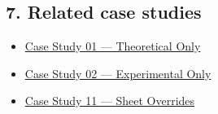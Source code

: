 \documentclass[
  11pt,
]{article}
\providecommand{\tightlist}{
  \setlength{\itemsep}{0pt}\setlength{\parskip}{0pt}}
\begin{document}
\hypertarget{7-related-case-studies}{
\subsection{7. Related case studies}\label{7-related-case-studies}}

\begin{itemize}
\tightlist
\item
  \href{https://github.com/pinarsyt/overlap-calculator/blob/main/case_studies/01_theoretical_only/README.md}{Case
  Study 01 --- Theoretical Only}
\item
  \href{https://github.com/pinarsyt/overlap-calculator/blob/main/case_studies/02_experimental_only/README.md}{Case
  Study 02 --- Experimental Only}
\item
  \href{https://github.com/pinarsyt/overlap-calculator/blob/main/case_studies/11_sheet_overrides/README.md}{Case
  Study 11 --- Sheet Overrides}
\end{itemize}
\end{document}
